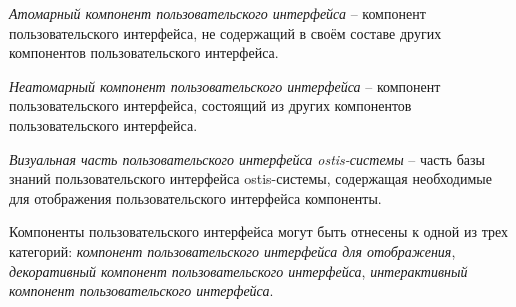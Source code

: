 \bigskip
\textit{Атомарный компонент пользовательского интерфейса} -- компонент пользовательского интерфейса, не содержащий в своём составе других компонентов пользовательского интерфейса.

\textit{Неатомарный компонент пользовательского интерфейса} -- компонент пользовательского интерфейса, состоящий из других компонентов пользовательского интерфейса.

\textit{Визуальная часть пользовательского интерфейса ostis-системы} -- часть базы знаний пользовательского интерфейса ostis-системы, содержащая необходимые для отображения пользовательского интерфейса компоненты.

\begin{SCn}


\end{SCn}

\bigskip
Компоненты пользовательского интерфейса могут быть отнесены к одной из трех категорий: \textit{компонент пользовательского интерфейса для отображения}, \textit{декоративный компонент пользовательского интерфейса}, \textit{интерактивный компонент пользовательского интерфейса}.

